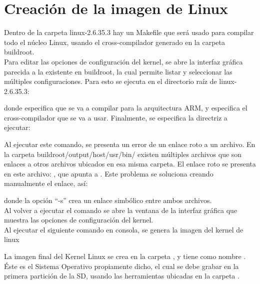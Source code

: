 \documentclass[12pt]{article}
\begin{document}
\section{Creación de la imagen de Linux}
\noindent 
Dentro de la carpeta linux-2.6.35.3 hay un Makefile que será usado para compilar todo el núcleo Linux, usando el cross-compilador generado en la carpeta buildroot.\\
Para editar las opciones de configuración del kernel, se abre la interfaz gráfica parecida a la existente en buildroot, la cual permite listar y seleccionar las múltiples configuraciones. Para esto se ejecuta en el directorio raíz de linux-2.6.35.3:
\begin{center}
\end{center}
\noindent
donde  especifica que se va a compilar para la arquitectura ARM, y  especifica el cross-compilador que se va a usar. Finalmente, se especifica la directriz a ejecutar:
\begin{center}
\end{center}
\noindent
Al ejecutar este comando, se presenta un error de un enlace roto a un archivo. En la carpeta buildroot/output/host/usr/bin/ existen múltiples archivos que son enlaces a otros archivos ubicados en esa misma carpeta. El enlace roto se presenta en este archivo: , que apunta a . Este problema se soluciona creando manualmente el enlace, así:
\begin{center}
\end{center}
\noindent
donde la opción ``-s'' crea un enlace simbólico entre ambos archivos.\\
Al volver a ejecutar el comando  se abre la ventana de la interfaz gráfica que muestra las opciones de configuración del kernel.\\
Al ejecutar el siguiente comando en consola, se genera la imagen del kernel de linux
\begin{center}
\end{center}
\noindent
La imagen final del Kernel Linux se crea en la carpeta , y tiene como nombre . Éste es el Sistema Operativo propiamente dicho, el cual se debe grabar en la primera partición de la SD, usando las herramientas ubicadas en la carpeta .
\end{document}
